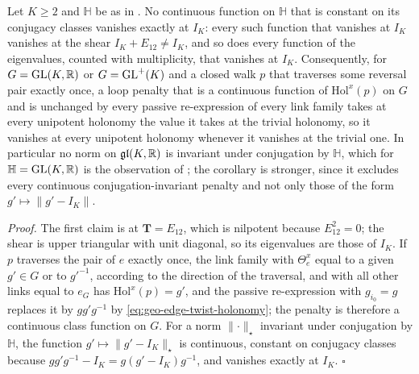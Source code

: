 Let $K\geq2$ and $\mathbb H$ be as in . No continuous function
on $\mathbb H$ that is constant on its conjugacy classes vanishes exactly at $I_K$: every such function
that vanishes at $I_K$ vanishes at the shear $I_K+E_{12}\neq I_K$, and so does every function of the
eigenvalues, counted with multiplicity, that vanishes at $I_K$. Consequently, for $G=\mathrm{GL}(K,\mathbb R)$ or
$G=\mathrm{GL}^+(K)$ and a closed walk $p$ that traverses some reversal pair exactly once, a loop penalty that
is a continuous function of $\mathrm{Hol}^x(p)$ on $G$ and is unchanged by every passive re-expression
of every link family takes at every unipotent holonomy the value it takes at the trivial holonomy, so it
vanishes at every unipotent holonomy whenever it vanishes at the trivial one. In particular no norm on
$\mathfrak{gl}(K,\mathbb R)$ is invariant under conjugation by $\mathbb H$, which for $\mathbb H=\mathrm{GL}(K,\mathbb R)$ is
the observation of ; the corollary is stronger, since it excludes every
continuous conjugation-invariant penalty and not only those of the form $g'\mapsto\lVert g'-I_K\rVert$.

\noindent\emph{Proof.}
The first claim is  at $\mathbf T=E_{12}$, which is
nilpotent because $E_{12}^2=0$; the shear is upper triangular with unit diagonal, so its eigenvalues are
those of $I_K$. If $p$ traverses the pair of $e$ exactly once, the link family with $\Theta^x_e$ equal
to a given $g'\in G$ or to $g'^{-1}$, according to the direction of the traversal, and with all other
links equal to $e_G$ has $\mathrm{Hol}^x(p)=g'$, and the passive re-expression with $g_{i_0}=g$ replaces
it by $gg'g^{-1}$ by \cref{eq:geo-edge-twist-holonomy}; the penalty is therefore a continuous class
function on $G$. For a norm $\lVert\cdot\rVert_\star$ invariant under conjugation by $\mathbb H$, the
function $g'\mapsto\lVert g'-I_K\rVert_\star$ is continuous, constant on conjugacy classes because
$gg'g^{-1}-I_K=g(g'-I_K)g^{-1}$, and vanishes exactly at $I_K$. \hfill$\square$

